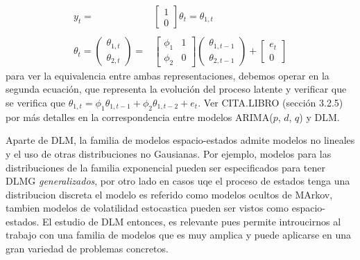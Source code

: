 \documentclass[12pt]{article}\usepackage[]{graphicx}\usepackage[]{color}
\begin{document}
\[ \begin{array}{rl}
y_t = & \begin{bmatrix}
1 \\
0
\end{bmatrix}
\theta_t = \theta_{1,t} \\
& \\
\theta_t = \begin{pmatrix} \theta_{1,t} \\ \theta_{2,t} \end{pmatrix} = &
\begin{bmatrix} \phi_1 & 1 \\ \phi_2 & 0 \end{bmatrix}
\begin{pmatrix} \theta_{1,t-1} \\ \theta_{2,t-1} \end{pmatrix}
+
\begin{bmatrix} e_t \\ 0 \end{bmatrix}
\end{array}
\]
para ver la equivalencia entre ambas representaciones, debemos operar en la segunda ecuación, que representa la evolución del proceso latente y verificar que se verifica que $\theta_{1,t} = \phi_1 \theta_{1,t-1} + \phi_2 \theta_{1,t-2} + e_t$. Ver CITA.LIBRO (sección 3.2.5) por más detalles en la correspondencia entre modelos ARIMA($p$, $d$, $q$) y DLM. 

Aparte de DLM, la familia de modelos espacio-estados admite modelos no lineales y el uso de otras distribuciones no Gausianas. Por ejemplo, modelos para las distribuciones de la familia exponencial pueden ser especificados para tener DLMG \textit{generalizados}, por otro lado en casos uqe el proceso de estados tenga una distribucion discreta el modelo es referido como modelos ocultos de MArkov, tambien modelos de volatilidad estocastica pueden ser vistos como espacio-estados. El estudio de DLM entonces, es relevante pues permite introucirnos al trabajo con una familia de modelos que es muy amplica y puede aplicarse en una gran variedad de problemas concretos. 


\end{document}
